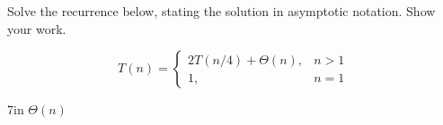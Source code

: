 \begin{prob}[(2 points)]
    Solve the recurrence below, stating the solution in asymptotic notation. Show your work.

    \[
        T(n) =
        \begin{cases}
            2 T(n/4) + \Theta(n),& n > 1\\
            1,& n = 1
        \end{cases}
    \]

    \begin{responsebox}{7in}
        $\Theta(n)$
    \end{responsebox}

\end{prob}
